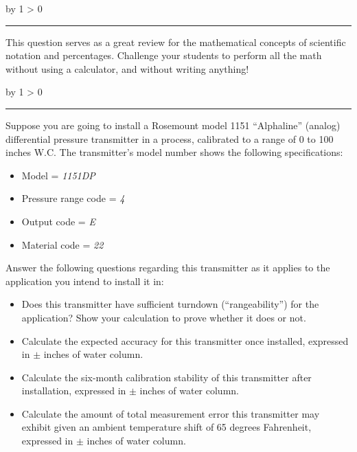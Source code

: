 \documentclass[12pt,a4paper]{article}
\def\oppgave{
            \advance\questnum by 1
            \ifnum \questnum > 0
                 \hrule
                 \vskip 3pt
                 \leftline{Oppgave \the\questnum}
                 \vskip 3pt \fi}
\def\notes{
           \advance\explnum by 1
           \ifnum \explnum > 0
                \hrule
                \vskip 3pt
                \leftline{Notes \the\explnum}
                \vskip 3pt \fi}
\begin{document}
\vskip 10pt \filbreak 





\notes{} 

This question serves as a great review for the mathematical concepts of scientific notation and percentages.  Challenge your students to perform all the math without using a calculator, and without writing anything!


\vfil \eject 



\oppgave{} 

Suppose you are going to install a Rosemount model 1151 ``Alphaline'' (analog) differential pressure transmitter in a process, calibrated to a range of 0 to 100 inches W.C.  The transmitter's model number shows the following specifications:

\begin{itemize}
\item{} Model = {\it 1151DP}
\item{} Pressure range code = {\it 4}
\item{} Output code = {\it E}
\item{} Material code = {\it 22}
\end{itemize}

Answer the following questions regarding this transmitter as it applies to the application you intend to install it in:

\vskip 20pt

\begin{itemize}
\item{} Does this transmitter have sufficient turndown (``rangeability'') for the application?  Show your calculation to prove whether it does or not.

\vskip 50pt

\item{} Calculate the expected accuracy for this transmitter once installed, expressed in $\pm$ inches of water column.

\vskip 50pt

\item{} Calculate the six-month calibration stability of this transmitter after installation, expressed in $\pm$ inches of water column.

\vskip 50pt

\item{} Calculate the amount of total measurement error this transmitter may exhibit given an ambient temperature shift of 65 degrees Fahrenheit, expressed in $\pm$ inches of water column.


\end{itemize}
\end{document}
